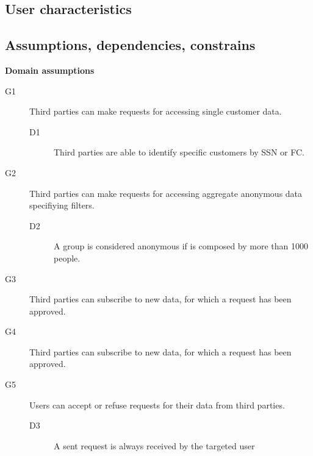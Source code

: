 \documentclass[../main.tex]{subfiles}
\begin{document}
\vspace{8mm}
\subsection{User characteristics}
\subsection{Assumptions, dependencies, constrains}

{\bf Domain assumptions}

\begin{description}

	\item [G1] Third parties can make requests for accessing single customer data.
	\begin{description}
		\item [D1] Third parties are able to identify specific customers by SSN or FC.
	\end{description}

	\item [G2] Third parties can make requests for accessing aggregate anonymous data specifiying filters.
	\begin{description}
		\item [D2] A group is considered anonymous if is composed by more than 1000 people.
	\end{description}

	\item [G3] Third parties can subscribe to new data, for which a request has been approved.
	\begin{description}
		\item %
	\end{description}

	\item [G4] Third parties can subscribe to new data, for which a request has been approved.
	\begin{description}
		\item
	\end{description}

	\item [G5]  Users can accept or refuse requests for their data from third parties.
	\begin{description}
		\item [D3]  A sent request is always received by the targeted user
	\end{description}


\end{description}
\end{document}
